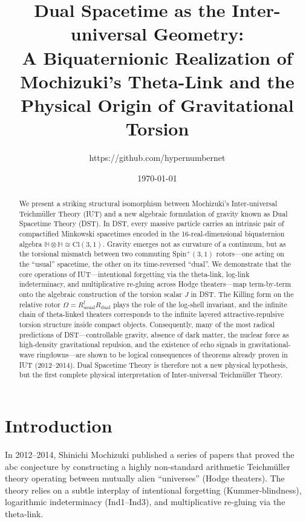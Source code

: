 \documentclass[dvipdfmx,11pt,a4paper]{article}
\title{\textbf{Dual Spacetime as the Inter-universal Geometry:\\ A Biquaternionic Realization of Mochizuki’s Theta-Link and the Physical Origin of Gravitational Torsion}}
\author{https://github.com/hypernumbernet}
\date{\today}
\begin{document}
\maketitle

\begin{abstract}
We present a striking structural isomorphism between Mochizuki’s Inter-universal Teichmüller Theory (IUT) and a new algebraic formulation of gravity known as Dual Spacetime Theory (DST).  
In DST, every massive particle carries an intrinsic pair of compactified Minkowski spacetimes encoded in the 16-real-dimensional biquaternion algebra $\mathbb{H}\otimes\mathbb{H}\cong\mathrm{Cl}(3,1)$. Gravity emerges not as curvature of a continuum, but as the torsional mismatch between two commuting Spin$^+(3,1)$ rotors—one acting on the “usual” spacetime, the other on its time-reversed “dual”.  
We demonstrate that the core operations of IUT—intentional forgetting via the theta-link, log-link indeterminacy, and multiplicative re-gluing across Hodge theaters—map term-by-term onto the algebraic construction of the torsion scalar $J$ in DST.  
The Killing form on the relative rotor $\Omega=R_{\text{usual}}^\dagger R_{\text{dual}}$ plays the role of the log-shell invariant, and the infinite chain of theta-linked theaters corresponds to the infinite layered attractive-repulsive torsion structure inside compact objects.  
Consequently, many of the most radical predictions of DST—controllable gravity, absence of dark matter, the nuclear force as high-density gravitational repulsion, and the existence of echo signals in gravitational-wave ringdowns—are shown to be logical consequences of theorems already proven in IUT (2012–2014).  
Dual Spacetime Theory is therefore not a new physical hypothesis, but the first complete physical interpretation of Inter-universal Teichmüller Theory.
\end{abstract}

\section{Introduction}

In 2012–2014, Shinichi Mochizuki published a series of papers \cite{MochizukiIUT1,MochizukiIUT2,MochizukiIUT3,MochizukiIUT4} that proved the abc conjecture by constructing a highly non-standard arithmetic Teichmüller theory operating between mutually alien “universes” (Hodge theaters).  
The theory relies on a subtle interplay of intentional forgetting (Kummer-blindness), logarithmic indeterminacy (Ind1–Ind3), and multiplicative re-gluing via the theta-link.
\end{document}
